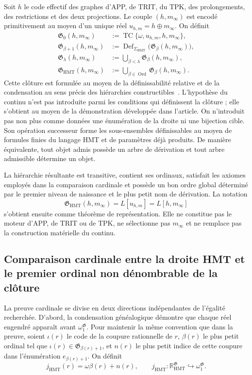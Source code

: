 Soit \(h\) le code effectif des graphes d’APP, de TRIT, du TPK, des
prolongements, des restrictions et des deux projections. Le couple
\((h,m_\infty)\) est encodé primitivement au moyen d’un unique réel
\(u_{h,m}=h\oplus m_\infty\). On définit
\[
 \begin{aligned}
 \mathfrak G_0(h,m_\infty)
   &:=\operatorname{TC}\{\omega,u_{h,m},h,m_\infty\},\\
 \mathfrak G_{\beta+1}(h,m_\infty)
   &:=\operatorname{Def}_{\Sigma_{\mathrm{HMT}}}
        \bigl(\mathfrak G_\beta(h,m_\infty)\bigr),\\
 \mathfrak G_\lambda(h,m_\infty)
   &:=\bigcup_{\beta<\lambda}\mathfrak G_\beta(h,m_\infty),\\
 \mathfrak G_{\mathrm{HMT}}(h,m_\infty)
   &:=\bigcup_{\beta\in\operatorname{Ord}}
        \mathfrak G_\beta(h,m_\infty).
 \end{aligned}
\]
Cette clôture est formulée au moyen de la définissabilité relative et de la condensation au
sens précis des hiérarchies constructibles~\cite{Jech2003}. L’hypothèse
du continu n’est pas introduite parmi les conditions qui définissent la clôture ; elle
s’obtient au moyen de la démonstration développée dans l’article. On n’introduit pas non plus
comme données une énumération de la droite ni une bijection cible. Son
opération successeur forme les sous-ensembles définissables au moyen de formules finies
du langage HMT et de paramètres déjà produits.
De manière équivalente, tout objet admis possède un arbre de dérivation et tout
arbre admissible détermine un objet.

La hiérarchie résultante est transitive, contient ses ordinaux, satisfait les axiomes employés dans la comparaison cardinale et possède un bon ordre global déterminé par le premier niveau de naissance et le plus petit nom de dérivation. La notation
\[
 \mathfrak G_{\mathrm{HMT}}(h,m_\infty)
 =L[u_{h,m}]=L[h,m_\infty]
\]
s'obtient ensuite comme théorème de représentation. Elle ne constitue pas le moteur d'APP, de TRIT ou de TPK, ne sélectionne pas \(m_\infty\) et ne remplace pas la construction matérielle du continu.

\subsection{Comparaison cardinale entre la droite HMT et le premier ordinal non dénombrable de la clôture}

La preuve cardinale se divise en deux directions indépendantes de l’égalité
recherchée. D’abord, la condensation généalogique démontre que chaque réel engendré
apparaît avant \(\omega_1^{\mathfrak G}\). Pour maintenir la même
convention que dans la preuve, soient \(\iota(r)\) le code de la coupure rationnelle
de \(r\), \(\beta(r)\) le plus petit ordinal tel que
\(\iota(r)\in\mathfrak G_{\beta(r)+1}\), et \(n(r)\) le plus petit indice
de cette coupure dans l’énumération \(e_{\beta(r)+1}\). On définit
\[
 j_{\mathrm{HMT}}(r)=\omega\beta(r)+n(r),
 \qquad
 j_{\mathrm{HMT}}:
 \mathbb R_{\mathrm{HMT}}^{\mathfrak G}
 \hookrightarrow\omega_1^{\mathfrak G}.
\]

